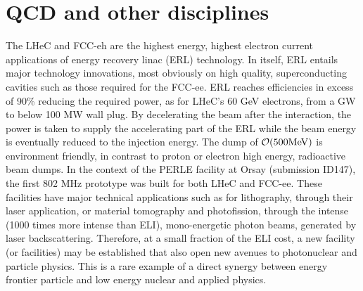 \section{QCD and other disciplines}



The LHeC and FCC-eh are the highest energy, highest electron current applications of energy recovery linac (ERL) technology. In itself, ERL entails major technology innovations, most obviously on high quality, superconducting cavities such as those required for the FCC-ee. 
ERL reaches efficiencies in excess of 90\% reducing the required power, as for LHeC's 60 GeV electrons, from a GW to below 100 MW wall plug. By decelerating the beam after the interaction, the power is taken to supply the accelerating part of the ERL while the beam energy is eventually reduced to the injection energy. 
The dump of ${\cal O}(500 {\rm MeV})$  is environment friendly, in contrast to proton or electron high energy, radioactive beam dumps. 
In the context of the PERLE facility at Orsay (submission ID147), the first 802 MHz prototype was built for both LHeC and FCC-ee.
These facilities have major technical applications such as for lithography, through their laser application, or material tomography and photofission, through the intense (1000 times more intense than ELI), mono-energetic photon beams, generated by laser backscattering. Therefore, at a small fraction of the ELI cost, a new facility (or facilities) may be established that also open new avenues to photonuclear and particle physics. This is a rare example of a direct synergy between energy frontier particle and low energy nuclear and applied physics.

